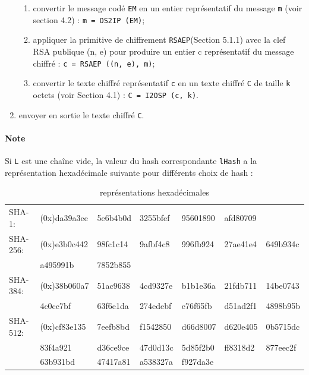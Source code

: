 \begin{enumerate}
	\begin{enumerate}
		\item convertir le message codé \texttt{EM} en un entier représentatif du message \texttt{m} (voir section 4.2) : \texttt{m = OS2IP (EM)};
		\item appliquer la primitive de chiffrement \texttt{RSAEP}(Section 5.1.1) avec la clef RSA publique (n, e) pour produire un entier c représentatif du message chiffré : \texttt{c = RSAEP ((n, e), m)};
		\item convertir le texte chiffré représentatif \texttt{c} en un texte chiffré \texttt{C} de taille \texttt{k} octets (voir Section 4.1) : \texttt{C = I2OSP (c, k)}.\\
	\end{enumerate}
	\item envoyer en sortie le texte chiffré \texttt{C}.\\
\end{enumerate}
\paragraph{Note}  Si \texttt{L} est une chaîne vide, la valeur du hash correspondante \texttt{lHash} a la représentation hexadécimale suivante pour différents choix de hash :


\begin{table}[H]
\centering
\begin{tabularx}{17cm}{Xllllll}
SHA-1: &  (0x)da39a3ee & 5e6b4b0d & 3255bfef & 95601890 & afd80709 & \\
SHA-256: 	& (0x)e3b0c442 	& 98fc1c14 	& 9afbf4c8 	& 996fb924 	& 27ae41e4 	& 649b934c\\
			& a495991b 		& 7852b855 	& 			& 			& 			&\\
SHA-384: 	& (0x)38b060a7 	& 51ac9638  	& 4cd9327e 	& b1b1e36a 	& 21fdb711 	& 14be0743\\
			& 4c0cc7bf 		& 63f6e1da 	& 274edebf 	& e76f65fb 	& d51ad2f1 	& 4898b95b\\
SHA-512: 	& (0x)cf83e135 	& 7eefb8bd 	& f1542850 	& d66d8007 	& d620e405 	& 0b5715dc\\
			& 83f4a921 		& d36ce9ce 	& 47d0d13c 	& 5d85f2b0 	& ff8318d2 	& 877eec2f\\
			& 63b931bd 		& 47417a81 	& a538327a 	& f927da3e	&			&\\
\end{tabularx}
\caption{représentations hexadécimales}
\label{repres_hexa}
\end{table}

